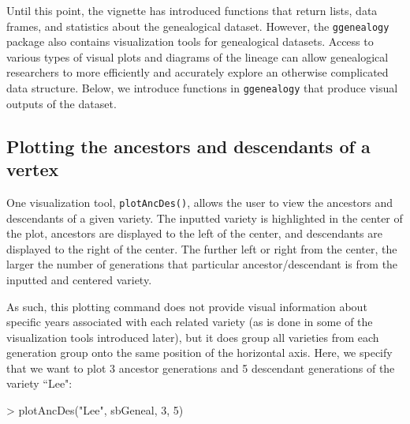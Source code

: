\documentclass{article}
\numberwithin{equation}{section} %
\newcommand{\pkg}[1]{{\texttt{#1}}}
\begin{document}
Until this point, the vignette has introduced functions that return lists, data frames, and statistics about the genealogical dataset. However, the \pkg{ggenealogy} package also contains visualization tools for genealogical datasets. Access to various types of visual plots and diagrams of the lineage can allow genealogical researchers to more efficiently and accurately explore an otherwise complicated data structure. Below, we introduce functions in \pkg{ggenealogy} that produce visual outputs of the dataset.

\subsection{Plotting the ancestors and descendants of a vertex}

One visualization tool, \texttt{plotAncDes()}, allows the user to view the ancestors and descendants of a given variety. The inputted variety is highlighted in the center of the plot, ancestors are displayed to the left of the center, and descendants are displayed to the right of the center. The further left or right from the center, the larger the number of generations that particular ancestor/descendant is from the inputted and centered variety.

As such, this plotting command does not provide visual information about specific years associated with each related variety (as is done in some of the visualization tools introduced later), but it does group all varieties from each generation group onto the same position of the horizontal axis. Here, we specify that we want to plot 3 ancestor generations and 5 descendant generations of the variety ``Lee":

\begin{Schunk}
\begin{Sinput}
> plotAncDes("Lee", sbGeneal, 3, 5)
\end{Sinput}
\end{Schunk}
\end{document}
